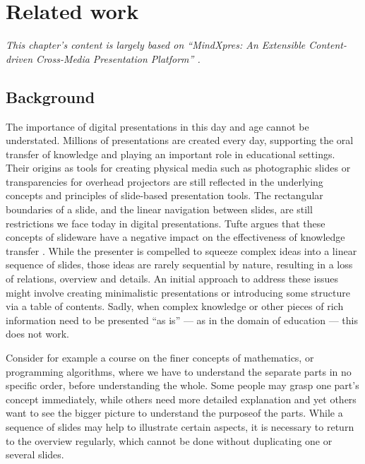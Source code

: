 
 \chapter{Related work}

  \emph{This chapter's content is largely based on ``MindXpres: An Extensible
  Content-driven Cross-Media Presentation Platform'' \citep{roels-1}.}

  \section{Background}

   The importance of digital presentations in this day and age cannot be
   understated. Millions of presentations are created every day, supporting the
   oral transfer of knowledge and playing an important role in educational
   settings. Their origins as tools for creating physical media such as
   photographic slides or transparencies for overhead projectors are still
   reflected in the underlying concepts and principles of slide-based
   presentation tools. The rectangular boundaries of a slide, and the linear
   navigation between slides, are still restrictions we face today in digital
   presentations. Tufte argues that these concepts of slideware have a negative
   impact on the effectiveness of knowledge transfer \citep{tufte-1}. While
   the presenter is compelled to squeeze complex ideas into a linear sequence
   of slides, those ideas are rarely sequential by nature, resulting in a loss
   of relations, overview and details. An initial approach to address these
   issues might involve creating minimalistic presentations or introducing some
   structure via a table of contents. Sadly, when complex knowledge or other
   pieces of rich information need to be presented “as is” \citep{farkas-1} ---
   as in the domain of education --- this does not work.

   Consider for example a course on the finer concepts of mathematics, or
   programming algorithms, where we have to understand the separate parts in no
   specific order, before understanding the whole. Some people may grasp one
   part's concept immediately, while others need more detailed explanation and
   yet others want to see the bigger picture to understand the purposeof the
   parts. While a sequence of slides may help to illustrate certain aspects, it
   is necessary to return to the overview regularly, which cannot be done
   without duplicating one or several slides.


